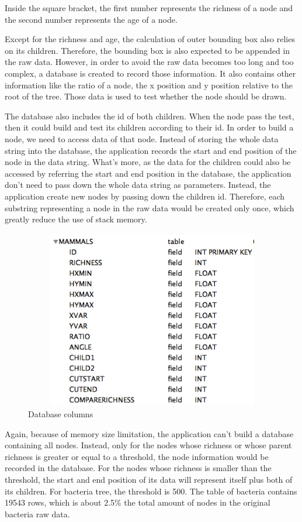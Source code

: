 \documentclass[MSc]{icldt}
\begin{document}
Inside the square bracket, the first number represents the richness of a node and the second number represents the age of a node.

Except for the richness and age, the calculation of outer bounding box also relies on its children. Therefore, the bounding box is also expected to be appended in the raw data. However, in order to avoid the raw data becomes too long and too complex, a database is created to record those information. It also contains other information like the ratio of a node, the x position and y position relative to the root of the tree. Those data is used to test whether the node should be drawn. 

The database also includes the id of both children. When the node pass the test, then it could build and test its children according to their id. In order to build a node, we need to access data of that node. Instead of storing the whole data string into the database, the application records the start and end position of the node in the data string. What's more, as the data for the children could also be accessed by referring the start and end position in the database, the application don't need to pass down the whole data string as parameters. Instead, the application create new nodes by passing down the children id. Therefore, each substring representing a node in the raw data would be created only once, which greatly reduce the use of stack memory. 

\begin{figure}[H]
  \centering
  \includegraphics [width=15cm,height=7.8cm]{Database}
  \caption{Database columns}
  \label{fig:mammal}
\end{figure}

Again, because of memory size limitation, the application can't build a database containing all nodes. Instead, only for the nodes whose richness or whose parent richness is greater or equal to a threshold, the node information would be recorded in the database. For the nodes whose richness is smaller than the threshold, the start and end position of its data will represent itself plus both of its children. For bacteria tree, the threshold is 500. The table of bacteria contains  19543 rows, which is about 2.5\% the total amount of nodes in the original bacteria raw data.
\end{document}
